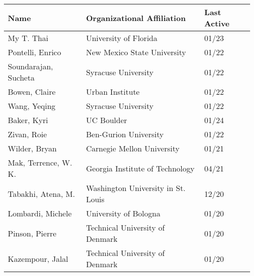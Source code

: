 \documentclass[localFont,alternative]{documentMETADATA}
\begin{document}
\centering
\begin{tabular}{lll}
\toprule
\textbf{Name} & \textbf{Organizational Affiliation} & \textbf{Last Active} \\
\midrule
		My T. Thai              & University of Florida								& 01/23 \\
		Pontelli, Enrico 			 	& New Mexico State University 				& 01/22 \\
		Soundarajan, Sucheta 		& Syracuse University 								& 01/22 \\
		Bowen, Claire 					& Urban Institute 										& 01/22 \\
		Wang, Yeqing 						& Syracuse University 								& 01/22 \\
		Baker, Kyri 						& UC Boulder 													& 01/24 \\
		Zivan, Roie 					  & Ben-Gurion University 							& 01/22 \\
		Wilder, Bryan 					& Carnegie Mellon University 					& 01/21 \\
		Mak, Terrence, W. K. 		& Georgia Institute of Technology 		& 04/21 \\
		Tabakhi, Atena, M. 			& Washington University in St. Louis  & 12/20 \\
		Lombardi, Michele 			& University of Bologna 							& 01/20 \\
		Pinson, Pierre 					& Technical University of Denmark 		& 01/20 \\
		Kazempour, Jalal 				& Technical University of Denmark 		& 01/20 \\
\bottomrule
\end{tabular}

\fi
\end{document}

